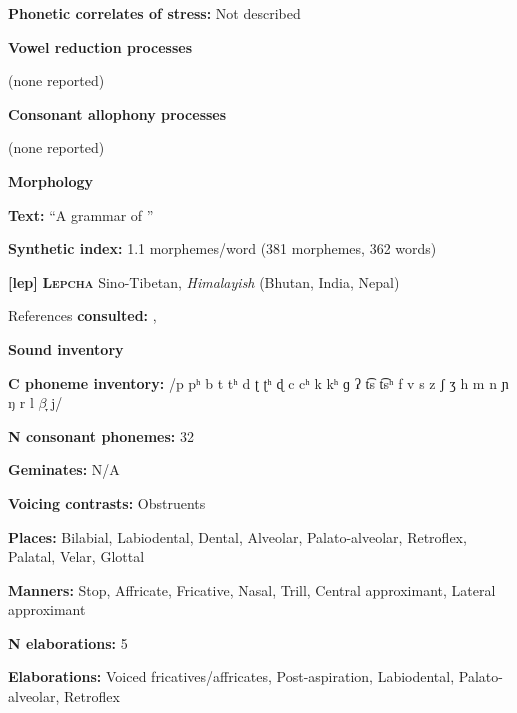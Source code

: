 \textbf{Phonetic correlates of stress:} Not described



\textbf{Vowel reduction processes}



(none reported)



\textbf{Consonant allophony processes}



(none reported)



\textbf{Morphology}



\textbf{Text:} “A grammar of ” \citep[488-497]{Enfield2007}



\textbf{Synthetic index:} 1.1 morphemes/word (381 morphemes, 362 words)



\textbf{[lep]}   \textbf{\textsc{Lepcha}}    Sino-Tibetan, \textit{Himalayish} (Bhutan, India, Nepal)



References \textbf{consulted:} \citet{Plaisier2007}, \citet{Sprigg1966}



\textbf{Sound inventory}



\textbf{C phoneme inventory:} /p pʰ b t tʰ d ʈ ʈʰ ɖ c cʰ k kʰ ɡ ʔ t͡s t͡sʰ f v s z ʃ ʒ h m n ɲ ŋ r l $\beta ̞$ j/



\textbf{N consonant phonemes:} 32



\textbf{Geminates:} N/A



\textbf{Voicing contrasts:} Obstruents



\textbf{Places:} Bilabial, Labiodental, Dental, Alveolar, Palato-alveolar, Retroflex, Palatal, Velar, Glottal



\textbf{Manners:} Stop, Affricate, Fricative, Nasal, Trill, Central approximant, Lateral approximant



\textbf{N elaborations:} 5



\textbf{Elaborations:} Voiced fricatives/affricates, Post-aspiration, Labiodental, Palato-alveolar, Retroflex




